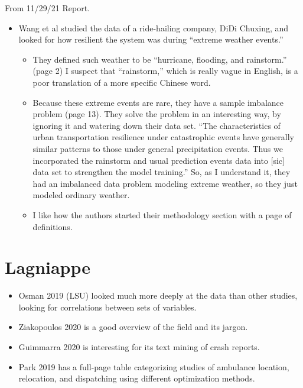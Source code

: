 From 11/29/21 Report.

\begin{itemize}
	\item Wang et al \cite{WANG2020102619} studied the data of a ride-hailing company, DiDi Chuxing, and looked for how resilient the system was during ``extreme weather events.''  
	\begin{itemize}
	\item They defined such weather to be ``hurricane, flooding, and rainstorm.'' (page 2)   I suspect that ``rainstorm,'' which is really vague in English, is a poor translation of a more specific Chinese word.  
	\item Because these extreme events are rare, they have a sample imbalance problem (page 13).  They solve the problem in an interesting way, by ignoring it and watering down their data set.  ``The characteristics of urban transportation resilience under catastrophic events have generally similar patterns to those under general precipitation events.  Thus we incorporated the rainstorm and usual prediction events data into [sic] data set to strengthen the model training.''  So, as I understand it, they had an imbalanced data problem modeling extreme weather, so they just modeled ordinary weather.  
	\item I like how the authors started their methodology section with a page of definitions.  
	\end{itemize}
	
\end{itemize}


\section{Lagniappe}

\begin{itemize}
	\item Osman 2019 (LSU) \cite{OSMAN2019274} looked much more deeply at the data than other studies, looking for correlations between sets of variables.  
	\item Ziakopoulos 2020 \cite{ZIAKOPOULOS2020105323} is a good overview of the field and its jargon.  
	
	\item Guimmarra 2020 \cite{GIUMMARRA2020105333} is interesting for its text mining of crash reports.  

	\item Park 2019 \cite{Park_2019} has a full-page table categorizing studies of ambulance location, relocation, and dispatching using different optimization methods.  

\end{itemize}


